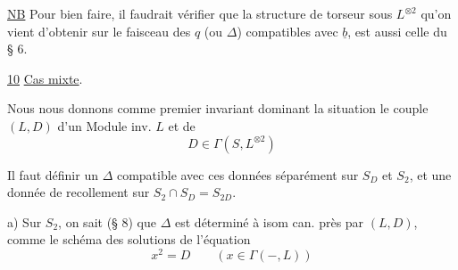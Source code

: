 \uline{NB} Pour bien faire, il faudrait vérifier que la structure de torseur sous $L^{\otimes2}$ qu'on vient d'obtenir sur le faisceau des $q$ (ou $\Delta$) compatibles avec $\underline b$, est aussi celle du § 6.

\uline{10} \uline{Cas mixte}. 


Nous nous donnons comme premier invariant dominant la situation le couple $(L,D)$ d'un Module inv. $L$ et de
\[D\in\Gamma(S,L^{\otimes2})\tag*{(103)}\]

Il faut définir un $\Delta$ compatible avec ces données séparément sur $S_D$ et $S_2$, et  une donnée de recollement sur $S_2\cap S_D=S_{2D}$.

a) Sur $S_2$, on sait (§ 8) que $\Delta$ est déterminé à isom can. près par $(L,D)$, comme le schéma des solutions de l'équation
\[x^2=D\qquad(x\in\Gamma(-,L))\tag*{(104)}\]
